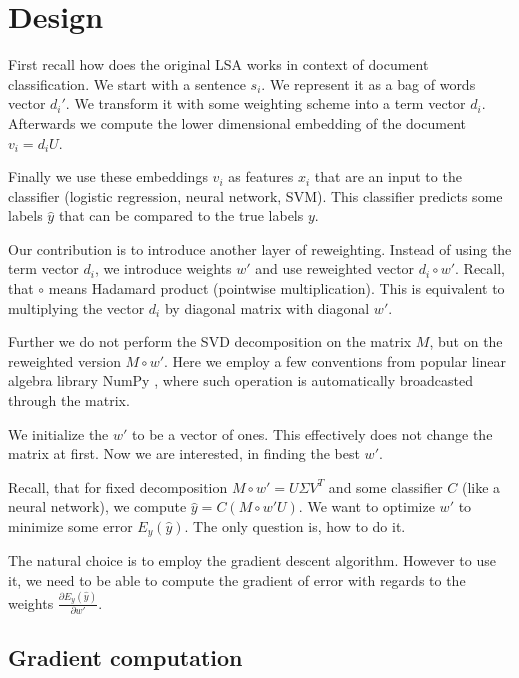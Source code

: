 \section{Design}

    First recall how does the original LSA works in context of document classification.
    We start with a sentence $s_i$. We represent it as a bag of words vector $d_i'$. 
    We transform it with some weighting scheme into a term vector $d_i$.
    Afterwards we compute the lower dimensional embedding of the document $v_i = d_i U$. 
    
    Finally we use these embeddings $v_i$ as features $x_i$ that are an input to the classifier (logistic regression, neural network, SVM).
    This classifier predicts some labels $\hat{y}$ that can be compared to
    the true labels $y$.
    
    Our contribution is to introduce another layer of reweighting. 
    Instead of using the term vector $d_i$, we introduce weights $w'$ and use reweighted vector $d_i \circ w'$.
    Recall, that $\circ$ means Hadamard product (pointwise multiplication).
    This is equivalent to multiplying the vector $d_i$ by diagonal matrix with diagonal $w'$.
    
    Further we do not perform the SVD decomposition on the matrix $M$, 
    but on the reweighted version $M \circ w'$. 
    Here we employ a few conventions from popular linear algebra library NumPy \cite{oliphant2006guide}, 
    where such operation is automatically broadcasted through the matrix.
    
    We initialize the $w'$ to be a vector of ones. 
    This effectively does not change the matrix at first.
    Now we are interested, in finding the best $w'$. 
    
    Recall, that for fixed decomposition $M\circ w'= U\Sigma V^T$ and some classifier $C$ (like a neural network),
    we compute $\hat{y} = C(M \circ w' U)$.
    We want to optimize $w'$ to minimize some error $E_y(\hat{y})$.
    The only question is, how to do it.
    
    The natural choice is to employ the gradient descent algorithm. 
    However to use it, we need to be able to compute the gradient of error with regards to the weights $\frac{\partial E_y(\hat{y})}{\partial w'}$.
    
    \subsection{Gradient computation}
    
